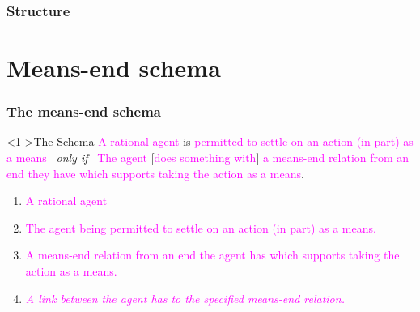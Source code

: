 \documentclass[noamssymb,
graphics,
]{beamer} %
\newcommand{\hozlinedash}[0]{
  \noindent\hdashrule[0.5ex][c]{\textwidth}{.1pt}{2.5pt}
}
\begin{document}
\begin{frame}


\end{frame}


\begin{frame}[noframenumbering]
  \frametitle{Structure}
  \tableofcontents[
  subsubsectionstyle=hide,
  ]
\end{frame}



\section{Means-end schema}
\label{sec:schema}

\begin{frame}
  \frametitle{The means-end schema}

  \begin{block}<1->{The Schema}
    \textcolor<3>{fuchsia}{A rational agent} is \textcolor<4>{fuchsia}{permitted to settle on an action (in part) as a means}
    \newline
    \mbox{ }\hfill\emph{only if}\hfill\mbox{ }
    \newline
    \textcolor<3>{fuchsia}{The agent} [\textcolor<6>{fuchsia}{does something with}] \textcolor<5>{fuchsia}{a means-end relation from an end they have which supports taking the action as a means}.
  \end{block}

  \begin{enumerate}
  \item<3-> \textcolor<3>{fuchsia}{A rational agent}
  \item<4-> \textcolor<4>{fuchsia}{The agent being permitted to settle on an action (in part) as a means.}
  \item<5-> \textcolor<5>{fuchsia}{A means-end relation from an end the agent has which supports taking the action as a means.}
  \item<6-> \textcolor<6->{fuchsia}{\emph<7>{A link between the agent has to the specified means-end relation.}}
  \end{enumerate}
\end{frame}
\end{document}

